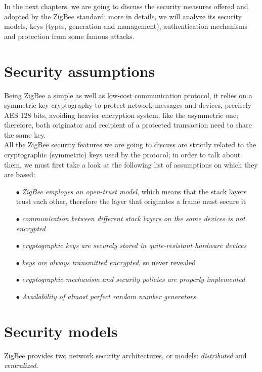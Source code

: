 \documentclass[12pt]{report}
\begin{document}
{In the next chapters, we are going to discuss the security measures offered and adopted by the ZigBee standard; more in details, we will analyze its security models, keys (types, generation and management), authentication mechanisms and protection from some famous attacks.\\


\clearpage
\section{Security assumptions}
\bigskip
Being ZigBee a simple as well as low-cost communication protocol, it relies on a symmetric-key cryptography to protect network messages and devices, precisely AES 128 bits, avoiding heavier encryption system, like the asymmetric one; therefore, both originator and recipient of a protected transaction need to share the same key.\\
All the ZigBee security features we are going to discuss are strictly related to the cryptographic (symmetric) keys used by the protocol; in order to talk about them, we must first take a look at the following list of assumptions on which they are based:

\begin{itemize}
\setlength{\itemindent}{+4mm}
\item[$\bullet$] \emph{ZigBee employes an open-trust model}, which means that the stack layers trust each other, therefore the layer that originates a frame must secure it
\item[$\bullet$] \emph{communication between different stack layers on the same devices is not encrypted}
\item[$\bullet$] \emph{cryptographic keys are securely stored in quite-resistant hardware devices}
\item[$\bullet$] \emph{keys are always transmitted encrypted}, so never revealed
\item[$\bullet$] \emph{cryptographic mechanism and security policies are properly implemented}
\item[$\bullet$] \emph{Availability of almost perfect random number generators}\\
\end{itemize}

\clearpage
\section{Security models}
\bigskip

ZigBee provides two network security architectures, or models: \emph{distributed} and \emph{centralized}.\\

}
\end{document}
